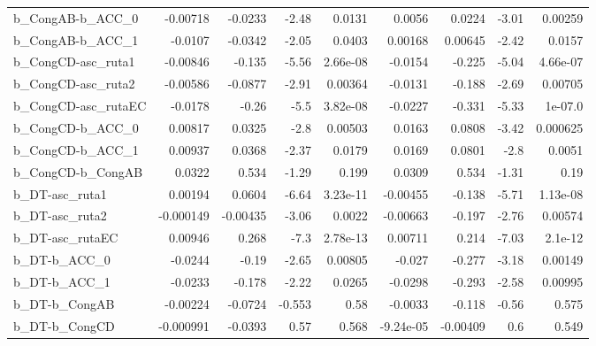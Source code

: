 \begin{tabular}{lrrrrrrrr}
b\_CongAB-b\_ACC\_0     &    -0.00718 &      -0.0233 &   -2.48 &   0.0131 &     0.0056 &      0.0224 &        -3.01 &       0.00259 \\
b\_CongAB-b\_ACC\_1     &     -0.0107 &      -0.0342 &   -2.05 &   0.0403 &    0.00168 &     0.00645 &        -2.42 &        0.0157 \\
b\_CongCD-asc\_ruta1   &    -0.00846 &       -0.135 &   -5.56 & 2.66e-08 &    -0.0154 &      -0.225 &        -5.04 &      4.66e-07 \\
b\_CongCD-asc\_ruta2   &    -0.00586 &      -0.0877 &   -2.91 &  0.00364 &    -0.0131 &      -0.188 &        -2.69 &       0.00705 \\
b\_CongCD-asc\_rutaEC  &     -0.0178 &        -0.26 &    -5.5 & 3.82e-08 &    -0.0227 &      -0.331 &        -5.33 &       1e-07.0 \\
b\_CongCD-b\_ACC\_0     &     0.00817 &       0.0325 &    -2.8 &  0.00503 &     0.0163 &      0.0808 &        -3.42 &      0.000625 \\
b\_CongCD-b\_ACC\_1     &     0.00937 &       0.0368 &   -2.37 &   0.0179 &     0.0169 &      0.0801 &         -2.8 &        0.0051 \\
b\_CongCD-b\_CongAB    &      0.0322 &        0.534 &   -1.29 &    0.199 &     0.0309 &       0.534 &        -1.31 &          0.19 \\
b\_DT-asc\_ruta1       &     0.00194 &       0.0604 &   -6.64 & 3.23e-11 &   -0.00455 &      -0.138 &        -5.71 &      1.13e-08 \\
b\_DT-asc\_ruta2       &   -0.000149 &     -0.00435 &   -3.06 &   0.0022 &   -0.00663 &      -0.197 &        -2.76 &       0.00574 \\
b\_DT-asc\_rutaEC      &     0.00946 &        0.268 &    -7.3 & 2.78e-13 &    0.00711 &       0.214 &        -7.03 &       2.1e-12 \\
b\_DT-b\_ACC\_0         &     -0.0244 &        -0.19 &   -2.65 &  0.00805 &     -0.027 &      -0.277 &        -3.18 &       0.00149 \\
b\_DT-b\_ACC\_1         &     -0.0233 &       -0.178 &   -2.22 &   0.0265 &    -0.0298 &      -0.293 &        -2.58 &       0.00995 \\
b\_DT-b\_CongAB        &    -0.00224 &      -0.0724 &  -0.553 &     0.58 &    -0.0033 &      -0.118 &        -0.56 &         0.575 \\
b\_DT-b\_CongCD        &   -0.000991 &      -0.0393 &    0.57 &    0.568 &  -9.24e-05 &    -0.00409 &          0.6 &         0.549 \\

\end{tabular}
